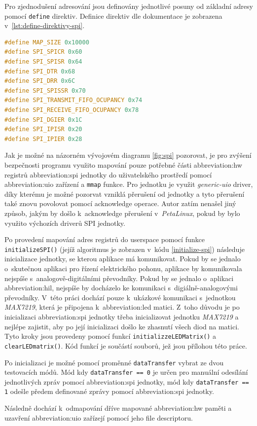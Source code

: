 \documentclass[a4paper, twoside, 11pt]{article}
\newcommand{\fbar}{\FloatBarrier}
\begin{document}
	Pro zjednodušení adresování jsou definovány jednotlivé posuny od základní adresy pomocí \texttt{define} direktiv. Definice direktiv dle dokumentace \cite{axi-quad-spi-ip-product-guide} je zobrazena v~\ref{lst:define-direktivy-spi}.\par

	\fbar
	\begin{lstlisting}[language={c++}, caption={Definice posuvu adres pro registry AXI Quad SPI bloku pomocí define direktiv.}, label={lst:define-direktivy-spi}]
#define MAP_SIZE 0x10000
#define SPI_SPICR 0x60
#define SPI_SPISR 0x64
#define SPI_DTR 0x68
#define SPI_DRR 0x6C
#define SPI_SPISSR 0x70
#define SPI_TRANSMIT_FIFO_OCUPANCY 0x74
#define SPI_RECEIVE_FIFO_OCUPANCY 0x78
#define SPI_DGIER 0x1C
#define SPI_IPISR 0x20
#define SPI_IPIER 0x28\end{lstlisting}

	Jak je možné na názorném vývojovém diagramu \ref{fig:spi} pozorovat, je pro zvýšení bezpečnosti programu využito mapování pouze potřebné části \gls{abbreviation:hw} registrů \gls{abbreviation:spi} jednotky do uživatelského prostředí pomocí \gls{abbreviation:uio} zařízení a \texttt{mmap} funkce. Pro jednotku je využit \textit{generic-uio} driver, díky kterému je možné pozorvat vzniklá přerušení od jednotky a tyto přerušení také znovu povolovat pomocí acknowledge operace. Autor zatím nenašel jiný způsob, jakým by došlo k~acknowledge přerušení v~\textit{PetaLinux}, pokud by bylo využito výchozích driverů SPI jednotky.\par
	Po provedení mapování adres registrů do userspace pomocí funkce \texttt{initializeSPI()} (jejíž algoritmus je zobrazen v~kódu \ref{initialize-spi}) následuje inicializace jednotky, se kterou aplikace má komunikovat. Pokud by se jednalo o~skutečnou aplikaci pro řízení elektrického pohonu, aplikace by komunikovala nejspíše s~analogově-digitálními převodníky. Pokud by se jednalo o~aplikaci \gls{abbreviation:hil}, nejspíše by docházelo ke komunikaci s~digiálně-analogovými převodníky. V~této práci dochází pouze k~ukázkové komunikaci s~jednotkou \textit{MAX7219}, která je připojena k~\gls{abbreviation:led} matici. Z~toho důvodu je po inicializaci \gls{abbreviation:spi} jednotky třeba inicializovat jednotku \textit{MAX7219} a nejlépe zajistit, aby po její inicializaci došlo ke zhasnutí všech diod na matici. Tyto kroky jsou provedeny pomocí funkcí \texttt{initializzeLEDMatrix()} a \texttt{clearLEDmatrix()}. Kód funkcí je součástí souborů, jež jsou přílohou této práce.\par
	Po inicializaci je možné pomocí proměnné \texttt{dataTransfer} vybrat ze dvou testovacích módů. Mód kdy \texttt{dataTransfer == 0} je určen pro manuální odesílání jednotlivých zpráv pomocí \gls{abbreviation:spi} jednotky, mód kdy \texttt{dataTransfer == 1} odešle předem definované zprávy pomocí \gls{abbreviation:spi} jednotky.\par
	Následně dochází k~odmapování dříve mapované \gls{abbreviation:hw} paměti a uzavření \gls{abbreviation:uio} zařízejí pomocí jeho file descriptoru.
\end{document}
